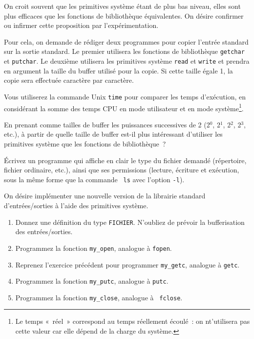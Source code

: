 \question

On croit souvent que les primitives système étant de plus bas niveau,
elles sont plus efficaces que les fonctions de bibliothèque
équivalentes. On désire confirmer ou infirmer cette proposition par
l'expérimentation.

Pour cela, on demande de rédiger deux programmes pour copier l'entrée
standard sur la sortie standard. Le premier utilisera les fonctions
de bibliothèque \texttt {getchar} et \texttt {putchar}.  Le deuxième
utilisera les primitives système \texttt {read} et \texttt {write}
et prendra en argument la taille du buffer utilisé pour la copie.
Si cette taille égale 1, la copie sera effectuée caractère par
caractère.

Vous utiliserez la commande Unix \texttt {time} pour comparer les
temps d'exécution, en considérant la somme des temps CPU en mode
utilisateur et en mode système\footnote {Le temps «~réel~» correspond
au temps réellement écoulé~: on nt'utilisera pas cette valeur car
elle dépend de la charge du système.}.

En prenant comme tailles de buffer les puissances successives de 2
(2$^0$, 2$^1$, 2$^2$, 2$^3$, etc.), à partir de quelle taille de
buffer est-il plus intéressant d'utiliser les primitives système
que les fonctions de bibliothèque~?


\question

Écrivez un programme qui affiche en clair le type du fichier demandé
(répertoire, fichier ordinaire, etc.), ainsi que ses permissions
(lecture, écriture et exécution, sous la même forme que la commande {\tt
ls} avec l'option {\tt -l}).


\question

On désire implémenter une nouvelle version de la librairie standard
d'entrées/sorties à l'aide des primitives système.

\begin {enumerate}
    \item Donnez une définition du type {\tt FICHIER}.  N'oubliez de
	prévoir la bufferisation des entrées/sorties.

    \item Programmez la fonction {\tt my\_open}, analogue à {\tt fopen}.

    \item Reprenez l'exercice précédent pour programmer {\tt my\_getc},
	analogue à {\tt getc}.

    \item Programmez la fonction {\tt my\_putc}, analogue à {\tt putc}.

    \item Programmez la fonction {\tt my\_close}, analogue à {\tt
	fclose}.

\end {enumerate}



